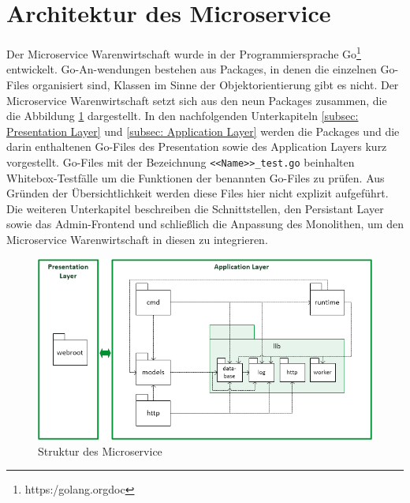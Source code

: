 \section{Architektur des Microservice}
\label{sec: Architektur des Microservice}
Der Microservice Warenwirtschaft wurde in der Programmiersprache Go\footnote{https:\//golang.org\/doc\/} entwickelt. Go-An-wendungen bestehen aus Packages, in denen die einzelnen Go-Files organisiert sind, Klassen im Sinne der Objektorientierung gibt es nicht. Der Microservice Warenwirtschaft setzt sich aus den neun Packages zusammen, die die Abbildung \ref{pic:Struktur des Microservice} dargestellt. In den nachfolgenden Unterkapiteln \ref{subsec: Presentation Layer} und \ref{subsec: Application Layer} werden die Packages und die darin enthaltenen Go-Files des Presentation sowie des Application Layers kurz vorgestellt. Go-Files mit der Bezeichnung \texttt{<<Name>>\_test.go} beinhalten Whitebox-Testfälle um die Funktionen der benannten Go-Files zu prüfen. Aus Gründen der Übersichtlichkeit werden diese Files hier nicht explizit aufgeführt. Die weiteren Unterkapitel beschreiben die Schnittstellen, den Persistant Layer sowie das Admin-Frontend und schließlich die Anpassung des Monolithen, um den Microservice Warenwirtschaft in diesen zu integrieren. 

\begin{figure}[H]
	\centering
	\includegraphics[width=0.95 \textwidth]{./pics/struktur.png}
	\caption{Struktur des Microservice}
	\label{pic:Struktur des Microservice}
\end{figure}

\newpage
